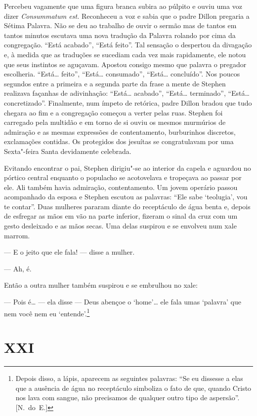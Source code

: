 Percebeu vagamente que uma figura branca subira ao púlpito e ouviu uma voz
dizer \textit{Consummatum est.}  Reconheceu a voz e sabia que o padre Dillon
pregaria a Sétima Palavra.  Não se deu ao trabalho de ouvir o sermão mas de		
tantos em tantos minutos escutava uma nova tradução da Palavra rolando por cima
da congregação.  “Está acabado”, “Está feito”.  Tal sensação o despertou da
divagação e, à medida que as traduções se sucediam cada vez mais rapidamente,
ele notou que seus instintos se aguçavam.  Apostou consigo mesmo que palavra o
pregador escolheria.  “Está\ldots{} feito”, “Está\ldots{} consumado”, “Está\ldots{}
concluído”.  Nos poucos segundos entre a primeira e a segunda parte da frase a
mente de Stephen realizava façanhas de adivinhação: “Está\ldots{} acabado”, “Está\ldots{}
terminado”, “Está\ldots{} concretizado”.  Finalmente, num ímpeto de retórica, padre
Dillon bradou que tudo chegara ao fim e a congregação começou a verter pelas
ruas.  Stephen foi carregado pela multidão e em torno de si ouviu os mesmos
murmúrios de admiração e as mesmas expressões de contentamento, burburinhos
discretos, exclamações contidas.  Os protegidos dos jesuítas se congratulavam
por uma Sexta"-feira Santa devidamente celebrada.

Evitando encontrar o pai, Stephen dirigiu"-se ao interior da capela e aguardou
no pórtico central enquanto o populacho se acotovelava e tropeçava ao passar
por ele.  Ali também havia admiração, contentamento.  Um jovem operário passou
acompanhado da esposa e Stephen escutou as palavras: “Ele sabe ‘teolugia’, vou
te contar”.  Duas mulheres pararam diante do receptáculo de água benta e,
depois de esfregar as mãos \label{em"-vao} em vão na parte inferior, fizeram o sinal da cruz
com um gesto desleixado e as mãos secas.  Uma delas suspirou e se envolveu num
xale marrom.

--- E o jeito que ele fala! --- disse a mulher.

--- Ah, é.

Então a outra mulher também suspirou e se embrulhou no xale:

--- Pois é\ldots{} --- ela disse --- Deus abençoe o ‘home’\ldots{} ele fala umas
‘palavra’ que nem você nem eu ‘entende’.\footnote{ Depois disso, a lápis,
aparecem as seguintes palavras: “Se eu dissesse a elas que a ausência de água
no receptáculo simboliza o fato de que, quando Cristo nos lava com sangue, não
precisamos de qualquer outro tipo de aspersão”. [N.~do~E.]}


\section*{XXI}

